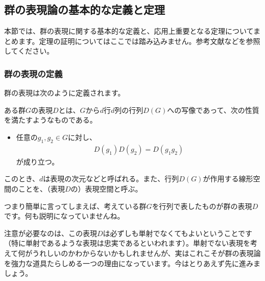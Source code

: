 \documentclass[uplatex,dvipdfmx,a4j,openany]{jsarticle}
\begin{document}



\subsection{群の表現論の基本的な定義と定理}
本節では、群の表現に関する基本的な定義と、応用上重要となる定理についてまとめます。定理の証明についてはここでは踏み込みません。参考文献などを参照してください。

\subsubsection{群の表現の定義}
群の表現は次のように定義されます。
\begin{tcolorbox}[title=定義：群の表現]
	ある群$G$の表現$D$とは、$G$から$d$行$d$列の行列$D(G)$への写像であって、次の性質を満たすようなものである。
	\begin{itemize}
		\item 任意の$g_1, g_2 \in G$に対し、\begin{align}
			D(g_1)D(g_2) = D(g_1 g_2) \label{eq:def_expression}
		\end{align}が成り立つ。
	\end{itemize}
	このとき、$d$は表現の次元などと呼ばれる。また、行列$D(G)$が作用する線形空間のことを、（表現$D$の）表現空間と呼ぶ。
\end{tcolorbox}

つまり簡単に言ってしまえば、考えている群$G$を行列で表したものが群の表現$D$です。何も説明になっていませんね。

注意が必要なのは、この表現$D$は必ずしも単射でなくてもよいということです（特に単射であるような表現は忠実であるといわれます）。単射でない表現を考えて何がうれしいのかわからないかもしれませんが、実はこれこそが群の表現論を強力な道具たらしめる一つの理由になっています。今はとりあえず先に進みましょう。
\end{document}
